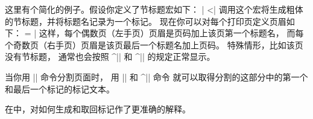{{{{{{{{{{%
这里有个简化的例子。假设你定义了节标题宏如下：
\csdisplay
\def\section#1{\medskip{\bf#1}\smallskip\mark{#1}}
|
^^|\mark|
调用这个宏将生成粗体的节标题，并将标题名记录为一个标记。
现在你可以对每个打印页定义页眉如下：
\csdisplay
\headline = {\ifodd\pageno \hfil\botmark\quad\folio
   \else \folio\quad\firstmark\hfil \fi}
|
这样，每个偶数页（左手页）页眉是页码加上该页第一个标题名，
而每个奇数页（右手页）页眉是该页最后一个标题名加上页码。
特殊情形，比如该页没有节标题，
通常也会按照 ^|\firstmark| 和 ^|\botmark| 的规定正常显示。

当你用 |\vsplit| 命令\ctsref{\vsplit}分割页面时，
用 |\splitfirstmark| 和 ^|\splitbotmark| 命令\ctsref{\splitfirstmark}%
就可以取得分割的这部分中的第一个和最后一个标记的标记文本。

在中，对如何生成和取回标记作了更准确的解释。
\endconcept


}}}}}}}}}}
